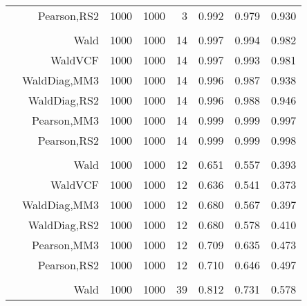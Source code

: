\documentclass[
]{article}
\begin{document}
\begin{table}[H]
{\begin{tabular}[t]{lrrrrrrr}
\hspace{1em} & Pearson,RS2 & 1000 & 1000 & 3 & 0.992 & 0.979 & 0.930\\
\cmidrule{1-8}
\addlinespace[0.3em]
\multicolumn{8}{l}{\textbf{1F 15V}}\\
\hspace{1em} & Wald & 1000 & 1000 & 14 & 0.997 & 0.994 & 0.982\\

\hspace{1em} & WaldVCF & 1000 & 1000 & 14 & 0.997 & 0.993 & 0.981\\

\hspace{1em} & WaldDiag,MM3 & 1000 & 1000 & 14 & 0.996 & 0.987 & 0.938\\

\hspace{1em} & WaldDiag,RS2 & 1000 & 1000 & 14 & 0.996 & 0.988 & 0.946\\

\hspace{1em} & Pearson,MM3 & 1000 & 1000 & 14 & 0.999 & 0.999 & 0.997\\

\hspace{1em} & Pearson,RS2 & 1000 & 1000 & 14 & 0.999 & 0.999 & 0.998\\
\cmidrule{1-8}
\addlinespace[0.3em]
\multicolumn{8}{l}{\textbf{2F 10V}}\\
\hspace{1em} & Wald & 1000 & 1000 & 12 & 0.651 & 0.557 & 0.393\\

\hspace{1em} & WaldVCF & 1000 & 1000 & 12 & 0.636 & 0.541 & 0.373\\

\hspace{1em} & WaldDiag,MM3 & 1000 & 1000 & 12 & 0.680 & 0.567 & 0.397\\

\hspace{1em} & WaldDiag,RS2 & 1000 & 1000 & 12 & 0.680 & 0.578 & 0.410\\

\hspace{1em} & Pearson,MM3 & 1000 & 1000 & 12 & 0.709 & 0.635 & 0.473\\

\hspace{1em} & Pearson,RS2 & 1000 & 1000 & 12 & 0.710 & 0.646 & 0.497\\
\cmidrule{1-8}
\addlinespace[0.3em]
\multicolumn{8}{l}{\textbf{3F 15V}}\\
\hspace{1em} & Wald & 1000 & 1000 & 39 & 0.812 & 0.731 & 0.578\\


\end{tabular}}
\end{table}
\end{document}
